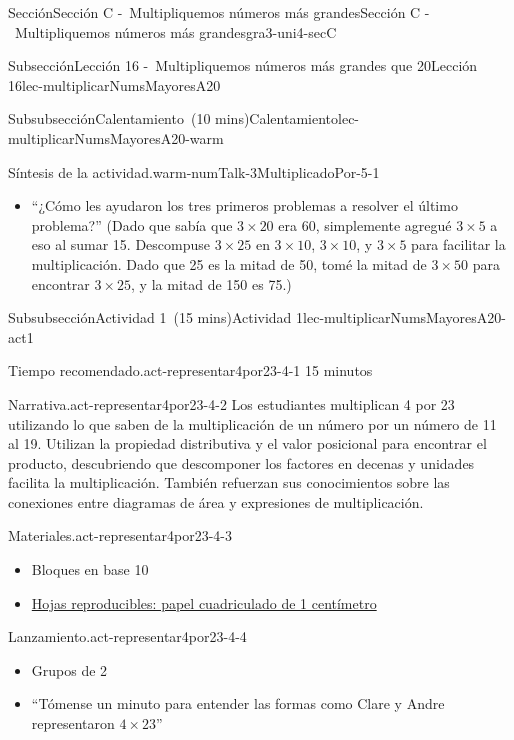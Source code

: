 \documentclass[oneside,10pt,]{article}
\begin{document}
\begin{sectionptx}{Sección}{Sección C -~Multipliquemos números más grandes}{}{Sección C -~Multipliquemos números más grandes}{}{}{gra3-uni4-secC}
\begin{subsectionptx}{Subsección}{Lección 16 -~Multipliquemos números más grandes que 20}{}{Lección 16}{}{}{lec-multiplicarNumsMayoresA20}
\begin{subsubsectionptx}{Subsubsección}{Calentamiento~(10 mins)}{}{Calentamiento}{}{}{lec-multiplicarNumsMayoresA20-warm}
\begin{paragraphs}{Síntesis de la actividad.}{warm-numTalk-3MultiplicadoPor-5-1}
%
\begin{itemize}[label=\textbullet]
\item{}``¿Cómo les ayudaron los tres primeros problemas a resolver el último problema?'' (Dado que sabía que \(3 \times 20\) era 60, simplemente agregué \(3 \times 5\) a eso al sumar 15. Descompuse \(3 \times 25\) en \(3 \times 10\), \(3 \times 10\), y \(3 \times 5\) para facilitar la multiplicación. Dado que 25 es la mitad de 50, tomé la mitad de \(3 \times 50\) para encontrar \(3 \times 25\), y la mitad de 150 es 75.)%
\end{itemize}
\end{paragraphs}%
\end{subsubsectionptx}
%
%
\typeout{************************************************}
\typeout{************************************************}
%
\begin{subsubsectionptx}{Subsubsección}{Actividad 1~(15 mins)}{}{Actividad 1}{}{}{lec-multiplicarNumsMayoresA20-act1}
\par
\begin{paragraphs}{Tiempo recomendado.}{act-representar4por23-4-1}%
15 minutos%
\end{paragraphs}%
\begin{paragraphs}{Narrativa.}{act-representar4por23-4-2}%
Los estudiantes multiplican 4 por 23 utilizando lo que saben de la multiplicación de un número por un número de 11 al 19. Utilizan la propiedad distributiva y el valor posicional para encontrar el producto, descubriendo que descomponer los factores en decenas y unidades facilita la multiplicación. También refuerzan sus conocimientos sobre las conexiones entre diagramas de área y expresiones de multiplicación.%
\end{paragraphs}%
\begin{paragraphs}{Materiales.}{act-representar4por23-4-3}%
%
\begin{itemize}[label=\textbullet]
\item{}Bloques en base 10%
\item{}\hyperref[blm-papelCuadriculadoCentimetro]{Hojas reproducibles: papel cuadriculado de 1 centímetro}%
\end{itemize}
\end{paragraphs}%
\begin{paragraphs}{Lanzamiento.}{act-representar4por23-4-4}%
%
\begin{itemize}[label=\textbullet]
\item{}Grupos de 2%
\item{}``Tómense un minuto para entender las formas como Clare y Andre representaron \(4 \times 23\)''%

\end{itemize}
\end{paragraphs}
\end{subsubsectionptx}
\end{subsectionptx}
\end{sectionptx}
\end{document}
